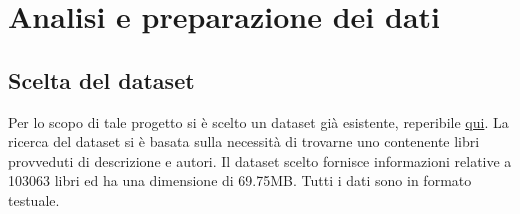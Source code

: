 \documentclass[12pt,oneside]{article}
\begin{document}
\newpage
\section{Analisi e preparazione dei dati}
    \begin{enumerate}
    \subsection{Scelta del dataset}
    \begin{justify}
    Per lo scopo di tale progetto si è scelto un dataset già esistente, reperibile \href{https://www.kaggle.com/datasets/elvinrustam/books-dataset}{qui}. La ricerca del dataset si è basata sulla necessità di trovarne uno contenente libri provveduti di descrizione e autori. Il dataset scelto fornisce informazioni relative a 103063 libri ed ha una dimensione di 69.75MB. Tutti i dati sono in formato testuale.
    \end{justify}
    \end{enumerate}
\end{document}

